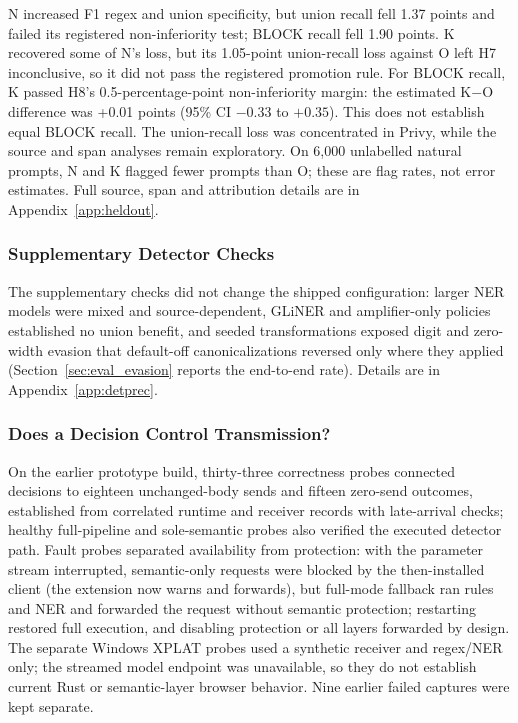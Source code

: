 \documentclass[sigconf]{acmart}
\theoremstyle{acmdefinition}\newtheorem{property}{Property}
\begin{document}
N increased F1 regex and union specificity, but union recall fell 1.37 points and failed its registered non-inferiority test; BLOCK recall fell 1.90 points. K recovered some of N's loss, but its 1.05-point union-recall loss against O left H7 inconclusive, so it did not pass the registered promotion rule. For BLOCK recall, K passed H8's 0.5-percentage-point non-inferiority margin: the estimated K$-$O difference was +0.01 points (95\% CI $-0.33$ to $+0.35$). This does not establish equal BLOCK recall. The union-recall loss was concentrated in Privy, while the source and span analyses remain exploratory. On 6,000 unlabelled natural prompts, N and K flagged fewer prompts than O; these are flag rates, not error estimates. Full source, span and attribution details are in Appendix~\ref{app:heldout}.

\subsubsection{Supplementary Detector Checks}
\label{sec:supplementary}
The supplementary checks did not change the shipped configuration: larger NER models were mixed and source-dependent, GLiNER and amplifier-only policies established no union benefit, and seeded transformations exposed digit and zero-width evasion that default-off canonicalizations reversed only where they applied (Section~\ref{sec:eval_evasion} reports the end-to-end rate). Details are in Appendix~\ref{app:detprec}.

\subsubsection{Does a Decision Control Transmission?}
\label{sec:installed_probes}
On the earlier prototype build, thirty-three correctness probes connected decisions to eighteen unchanged-body sends and fifteen zero-send outcomes, established from correlated runtime and receiver records with late-arrival checks; healthy full-pipeline and sole-semantic probes also verified the executed detector path. Fault probes separated availability from protection: with the parameter stream interrupted, semantic-only requests were blocked by the then-installed client (the extension now warns and forwards), but full-mode fallback ran rules and NER and forwarded the request without semantic protection; restarting restored full execution, and disabling protection or all layers forwarded by design. The separate Windows XPLAT probes used a synthetic receiver and regex/NER only; the streamed model endpoint was unavailable, so they do not establish current Rust or semantic-layer browser behavior. Nine earlier failed captures were kept separate.
\end{document}
